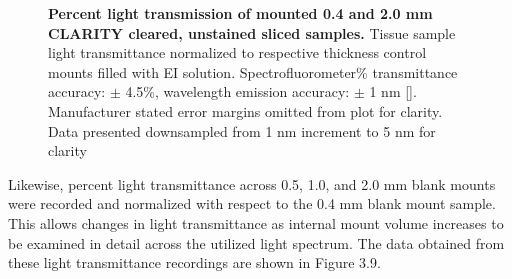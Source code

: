 \begin{figure}[H]
    \centering
    \caption{\textbf{Percent light transmission of mounted 0.4 and 2.0 mm CLARITY cleared, unstained sliced samples.} Tissue sample light transmittance normalized to respective thickness control mounts filled with EI solution. Spectrofluorometer\% transmittance accuracy: $\pm$ 4.5\%, wavelength emission accuracy: $\pm$ 1 nm []. Manufacturer stated error margins omitted from plot for clarity. Data presented downsampled from 1 nm increment to 5 nm for clarity}
    \label{fig:enter-label}
\end{figure}

Likewise, percent light transmittance across 0.5, 1.0, and 2.0 mm blank mounts were recorded and normalized with respect to the 0.4 mm blank mount sample. This allows changes in light transmittance as internal mount volume increases to be examined in detail across the utilized light spectrum. The data obtained from these light transmittance recordings are shown in Figure 3.9.
    
